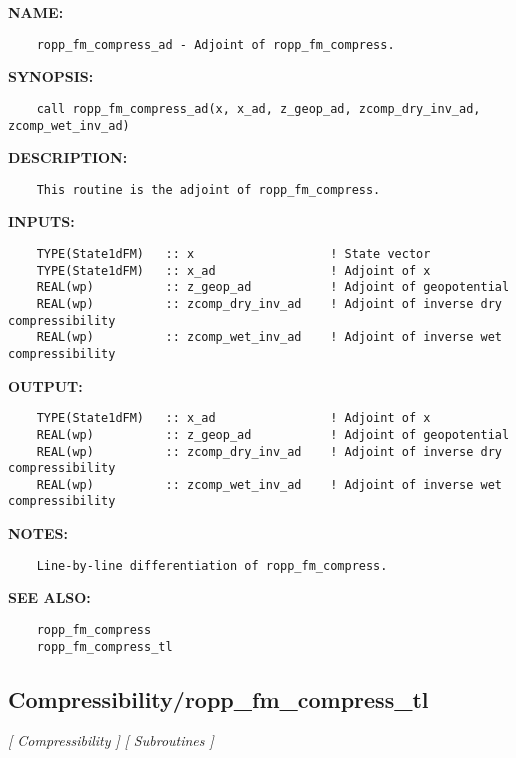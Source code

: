 \label{ch:robo21}
\label{ch:Compressibility_ropp_fm_compress_ad}
\textbf{NAME:}\hspace{0.08in}\begin{Verbatim}
    ropp_fm_compress_ad - Adjoint of ropp_fm_compress.
\end{Verbatim}
\textbf{SYNOPSIS:}\hspace{0.08in}\begin{Verbatim}
    call ropp_fm_compress_ad(x, x_ad, z_geop_ad, zcomp_dry_inv_ad, zcomp_wet_inv_ad)
\end{Verbatim}
\textbf{DESCRIPTION:}\hspace{0.08in}\begin{Verbatim}
    This routine is the adjoint of ropp_fm_compress.
\end{Verbatim}
\textbf{INPUTS:}\hspace{0.08in}\begin{Verbatim}
    TYPE(State1dFM)   :: x                   ! State vector
    TYPE(State1dFM)   :: x_ad                ! Adjoint of x
    REAL(wp)          :: z_geop_ad           ! Adjoint of geopotential
    REAL(wp)          :: zcomp_dry_inv_ad    ! Adjoint of inverse dry compressibility
    REAL(wp)          :: zcomp_wet_inv_ad    ! Adjoint of inverse wet compressibility
\end{Verbatim}
\textbf{OUTPUT:}\hspace{0.08in}\begin{Verbatim}
    TYPE(State1dFM)   :: x_ad                ! Adjoint of x
    REAL(wp)          :: z_geop_ad           ! Adjoint of geopotential
    REAL(wp)          :: zcomp_dry_inv_ad    ! Adjoint of inverse dry compressibility
    REAL(wp)          :: zcomp_wet_inv_ad    ! Adjoint of inverse wet compressibility
\end{Verbatim}
\textbf{NOTES:}\hspace{0.08in}\begin{Verbatim}
    Line-by-line differentiation of ropp_fm_compress.
\end{Verbatim}
\textbf{SEE ALSO:}\hspace{0.08in}\begin{Verbatim}
    ropp_fm_compress
    ropp_fm_compress_tl
\end{Verbatim}
\subsection{Compressibility/ropp\_fm\_compress\_tl}
\textsl{[ Compressibility ]}
\textsl{[ Subroutines ]}

